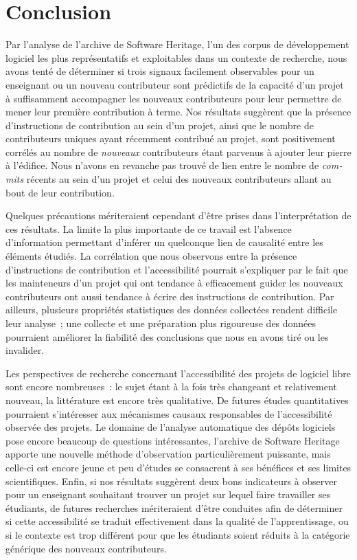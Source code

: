 \documentclass[dvipsnames,runningheads]{llncs}
\newcommand{\en}[1]{\foreignlanguage{english}{\emph{#1}}}
\begin{document}
    \section{Conclusion}

    Par l'analyse de l'archive de Software Heritage, l'un des corpus de développement logiciel les plus
    représentatifs et exploitables dans un contexte de recherche, nous avons tenté de déterminer si trois
    signaux facilement observables pour un enseignant ou un nouveau contributeur sont prédictifs de la
    capacité d'un projet à suffisamment accompagner les nouveaux contributeurs pour leur permettre de mener
    leur première contribution à terme. Nos résultats suggèrent que la présence d'instructions de contribution
    au sein d'un projet, ainsi que le nombre de contributeurs uniques ayant récemment contribué au projet,
    sont positivement corrélés au nombre de \emph{nouveaux} contributeurs étant parvenus à ajouter leur pierre
    à l'édifice. Nous n'avons en revanche pas trouvé de lien entre le nombre de \en{commits} récents au sein
    d'un projet et celui des nouveaux contributeurs allant au bout de leur contribution.

    Quelques précautions mériteraient cependant d'être prises dans l'interprétation de ces résultats. La
    limite la plus importante de ce travail est l'absence d'information permettant d'inférer un quelconque
    lien de causalité entre les éléments étudiés. La corrélation que nous observons entre la présence
    d'instructions de contribution et l'accessibilité pourrait s'expliquer par le fait que les mainteneurs
    d'un projet qui ont tendance à efficacement guider les nouveaux contributeurs ont aussi tendance à écrire
    des instructions de contribution. Par ailleurs, plusieurs propriétés statistiques des données collectées
    rendent difficile leur analyse ; une collecte et une préparation plus rigoureuse des données pourraient
    améliorer la fiabilité des conclusions que nous en avons tiré ou les invalider.

    Les perspectives de recherche concernant l'accessibilité des projets de logiciel libre sont encore
    nombreuses : le sujet étant à la fois très changeant et relativement nouveau, la littérature est encore
    très qualitative. De futures études quantitatives pourraient s'intéresser aux mécanismes causaux
    responsables de l'accessibilité observée des projets. Le domaine de l'analyse automatique des dépôts
    logiciels pose encore beaucoup de questions intéressantes, l'archive de Software Heritage apporte une
    nouvelle méthode d'observation particulièrement puissante, mais celle-ci est encore jeune et peu d'études
    se consacrent à ses bénéfices et ses limites scientifiques. Enfin, si nos résultats suggèrent deux bons
    indicateurs à observer pour un enseignant souhaitant trouver un projet sur lequel faire travailler ses
    étudiants, de futures recherches mériteraient d'être conduites afin de déterminer si cette accessibilité
    se traduit effectivement dans la qualité de l'apprentissage, ou si le contexte est trop différent pour que
    les étudiants soient réduits à la catégorie générique des nouveaux contributeurs.

    \printbibliography[heading=bibintoc]
\end{document}
